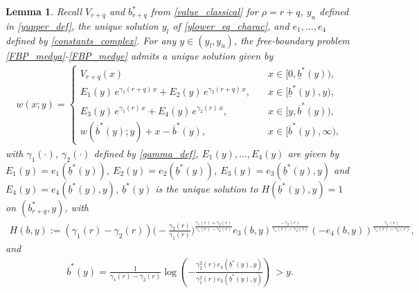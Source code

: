 \documentclass[11pt]{article} %
\newtheorem{lemma}[theorem]{Lemma}
\newcommand{\ubar}[1]{\underaccent{\bar}{#1}}
\numberwithin{komcounter}{section}
\renewcommand{\ubar}{\underline}
\renewcommand{\bar}{\overline}
\numberwithin{equation}{section}
\numberwithin{theorem}{section}
\begin{document}
\begin{lemma} \label{fbp2_ex}
Recall $V_{r+q}$ and $b^*_{r+q}$ from \eqref{value_classical} for $\rho=r+q$, 
$y_u$ defined in \eqref{yupper_def}, 
the unique solution $y_l$ of \eqref{ylower_eq_charac}, 
and $e_1, \ldots, e_4$ defined by \eqref{constants_complex}. 
For any $y\in(y_l,y_u)$, the free-boundary problem \eqref{FBP_medya}-\eqref{FBP_medye} admits a unique solution given by 
\begin{align} \label{w_sol_double_def}
w(x;y)= 
\begin{cases}
V_{r+q}(x)\quad &x \in [0,\ubar{b}^*(y)),\\
E_1(y) \, e^{\gamma_1(r+q) \, x} + E_2(y) \, e^{\gamma_2(r+q) \, x}, \quad &x \in [\ubar{b}^*(y),y),\\
E_3(y) \, e^{\gamma_1(r) \, x} + E_4(y) \, e^{\gamma_2(r) \, x}, \quad &x \in [y,\bar{b}^*(y)),\\
w(\bar{b}^*(y);y) + x - \bar{b}^*(y), \quad &x\in [\bar{b}^*(y),\infty),
\end{cases}
\end{align} 
with $\gamma_1(\cdot)$, $\gamma_2(\cdot)$ defined by \eqref{gamma_def}, $E_1(y), \ldots, E_4(y)$ are given by 
$E_1(y) = e_1(\ubar{b}^*(y))$, $E_2(y) 
= e_2(\ubar{b}^*(y))$, $E_3(y) = e_3(\ubar{b}^*(y),y)$ and $E_4(y) = e_4(\ubar{b}^*(y),y)$,  
$\ubar{b}^*(y)$ is the unique solution to $H(\ubar{b}^*(y),y) = 1$ on $(b^*_{r+q},y)$, with 
\begin{align} \label{H_eq_midy}
H(b,y):= 
(\gamma_1(r)-\gamma_2(r)) \Big(-\frac{\gamma_2(r)}{\gamma_1(r)}\Big)^{\frac{\gamma_1(r)+\gamma_2(r)}{\gamma_1(r)-\gamma_2(r)}} e_3(b,y)^{\frac{-\gamma_2(r)}{\gamma_1(r)-\gamma_2(r)}}(-e_4(b,y))^{\frac{\gamma_1(r)}{\gamma_1(r)-\gamma_2(r)}},
\end{align}
and 
\begin{align} \label{upperb_solv}
\bar{b}^*(y) 
= \frac{1}{\gamma_1(r)-\gamma_2(r)} \log\left(-\frac{\gamma_2^2(r)e_4(\ubar{b}^*(y),y)}{\gamma_1^2(r)e_3(\ubar{b}^*(y),y)}\right) \, > y .
\end{align}
\end{lemma} 
\end{document}
